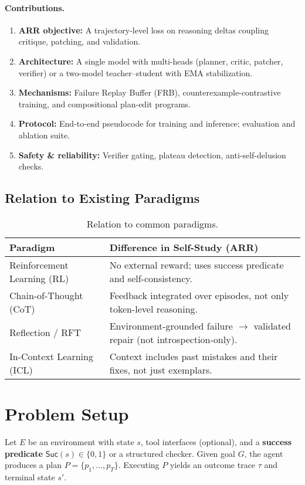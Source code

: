 \documentclass[11pt]{article}
\newcommand{\Suc}{\mathsf{Suc}}
\begin{document}
\paragraph{Contributions.}
\begin{enumerate}[leftmargin=1.4em]
    \item \textbf{ARR objective:} A trajectory-level loss on reasoning deltas coupling critique, patching, and validation.
    \item \textbf{Architecture:} A single model with multi-heads (planner, critic, patcher, verifier) or a two-model teacher--student with EMA stabilization.
    \item \textbf{Mechanisms:} Failure Replay Buffer (FRB), counterexample-contrastive training, and compositional plan-edit programs.
    \item \textbf{Protocol:} End-to-end pseudocode for training and inference; evaluation and ablation suite.
    \item \textbf{Safety \& reliability:} Verifier gating, plateau detection, anti-self-delusion checks.
\end{enumerate}

\subsection*{Relation to Existing Paradigms}
\begin{table}[H]
\centering
\caption{Relation to common paradigms.}
\begin{tabular}{@{}ll@{}}
\toprule
\textbf{Paradigm} & \textbf{Difference in Self-Study (ARR)} \\
\midrule
Reinforcement Learning (RL) & No external reward; uses success predicate and self-consistency. \\
Chain-of-Thought (CoT) & Feedback integrated over episodes, not only token-level reasoning. \\
Reflection / RFT & Environment-grounded failure $\rightarrow$ validated repair (not introspection-only). \\
In-Context Learning (ICL) & Context includes past mistakes and their fixes, not just exemplars. \\
\bottomrule
\end{tabular}
\end{table}

\section{Problem Setup}
Let $E$ be an environment with state $s$, tool interfaces (optional), and a \textbf{success predicate} $\Suc(s) \in \{0,1\}$ or a structured checker. Given goal $G$, the agent produces a plan $P=\{p_1,\dots,p_T\}$. Executing $P$ yields an outcome trace $\tau$ and terminal state $s'$.
\end{document}
